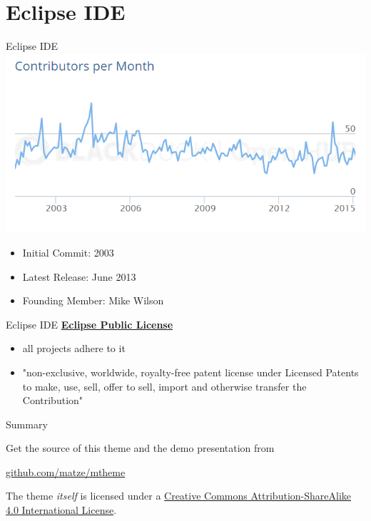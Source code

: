 \documentclass[10pt, compress]{beamer}
\begin{document}
\section{Eclipse IDE}

\begin{frame}{Eclipse IDE}
\includegraphics[width=\textwidth]{images/EclipseContributors.png}
    \begin{itemize}
    \item Initial Commit: 2003
    \item Latest Release: June 2013
    \item Founding Member: Mike Wilson
    \end{itemize}
\end{frame}

\begin{frame}{Eclipse IDE}
    \textbf{\href{http://www.eclipse.org/legal/epl-v10.html}{Eclipse Public License}}
    \begin{itemize}
    \item all projects adhere to it
    \item "non-exclusive, worldwide, royalty-free patent license under Licensed Patents to make, use, sell, offer to sell, import and otherwise transfer the Contribution"
    \end{itemize}
\end{frame}

\begin{frame}{Summary}

  Get the source of this theme and the demo presentation from

  \begin{center}\url{github.com/matze/mtheme}\end{center}

  The theme \emph{itself} is licensed under a
  \href{http://creativecommons.org/licenses/by-sa/4.0/}{Creative Commons
  Attribution-ShareAlike 4.0 International License}.

  \begin{center}\ccbysa\end{center}

\end{frame}

\end{document}
